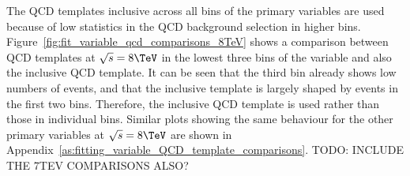 \FloatBarrier

The QCD templates inclusive across all bins of the primary variables are used because of low statistics in the
QCD background selection in higher bins. Figure~\ref{fig:fit_variable_qcd_comparisons_8TeV} shows a comparison
between QCD templates at $\sqrt{s}=8\TeV$ in the lowest three bins of the \met variable and also the inclusive
\met QCD template. It can be seen that the third \met bin already shows low numbers of events, and that the
inclusive template is largely shaped by events in the first two bins. Therefore, the inclusive QCD template is
used rather than those in individual bins. Similar plots showing the same behaviour for the other primary
variables at $\sqrt{s}=8\TeV$ are shown in Appendix~\ref{as:fitting_variable_QCD_template_comparisons}. TODO:
INCLUDE THE 7TEV COMPARISONS ALSO? %

